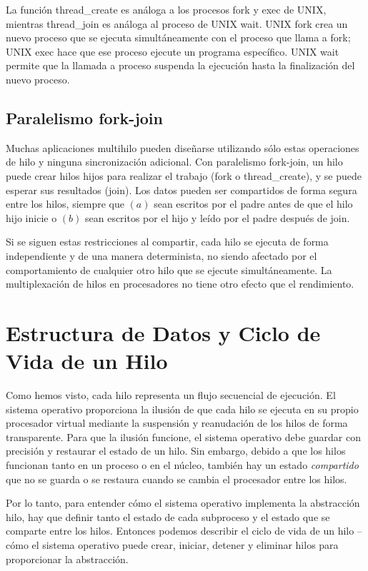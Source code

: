 \documentclass[10pt]{book}
\begin{document}
La función {\mf thread\_create} es análoga a los procesos {\mf fork} y {\mf exec} de UNIX, mientras {\mf thread\_join} es análoga al proceso de UNIX {\mf wait}. UNIX {\mf fork} crea un nuevo proceso que se ejecuta simultáneamente con el proceso que llama a {\mf fork}; UNIX {\mf exec} hace que ese proceso ejecute un programa específico. UNIX {\mf wait} permite que la llamada a proceso suspenda la ejecución hasta la finalización del nuevo proceso.

\subsection{Paralelismo fork-join}
Muchas aplicaciones multihilo pueden diseñarse utilizando sólo estas operaciones de hilo y ninguna sincronización adicional. Con paralelismo {\mf fork-join}, un hilo puede crear hilos hijos para realizar el trabajo ({\mf fork} o {\mf thread\_create}), y se puede esperar sus resultados ({\mf join}). Los datos pueden ser compartidos de forma segura entre los hilos, siempre que $(a)$ sean escritos por el padre antes de que el hilo hijo inicie o $(b)$ sean escritos por el hijo y leído por el padre después de {\mf join}.

Si se siguen estas restricciones al compartir, cada hilo se ejecuta de forma independiente y de una manera determinista, no siendo afectado por el comportamiento de cualquier otro hilo que se ejecute simultáneamente. La multiplexación de hilos en procesadores no tiene otro efecto que el rendimiento.

\section{Estructura de Datos y Ciclo de Vida de un Hilo}
Como hemos visto, cada hilo representa un flujo secuencial de ejecución. El sistema operativo proporciona la ilusión de que cada hilo se ejecuta en su propio procesador virtual mediante la suspensión y reanudación de los hilos de forma transparente. Para que la ilusión funcione, el sistema operativo debe guardar con precisión y restaurar el estado de un hilo. Sin embargo, debido a que los hilos funcionan tanto en un proceso o en el núcleo, también hay un estado \textit{compartido} que no se guarda o se restaura cuando se cambia el procesador entre los hilos.

Por lo tanto, para entender cómo el sistema operativo implementa la abstracción hilo, hay que definir tanto el estado de cada subproceso y el estado que se comparte entre los hilos. Entonces podemos describir el ciclo de vida de un hilo -- cómo el sistema operativo puede crear, iniciar, detener y eliminar hilos para proporcionar la abstracción.
\end{document}
